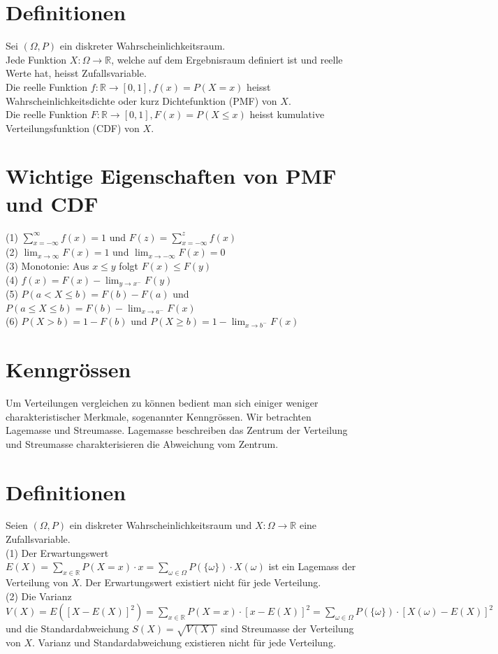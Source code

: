 \documentclass[10pt]{article}
\begin{document}
\section*{Definitionen}
Sei $(\Omega, P)$ ein diskreter Wahrscheinlichkeitsraum.\\
Jede Funktion $X: \Omega \rightarrow \mathbb{R}$, welche auf dem Ergebnisraum definiert ist und reelle Werte hat, heisst Zufallsvariable.\\
Die reelle Funktion $f: \mathbb{R} \rightarrow[0,1], f(x)=P(X=x)$ heisst Wahrscheinlichkeitsdichte oder kurz Dichtefunktion (PMF) von $X$.\\
Die reelle Funktion $F: \mathbb{R} \rightarrow[0,1], F(x)=P(X \leq x)$ heisst kumulative Verteilungsfunktion (CDF) von $X$.

\section*{Wichtige Eigenschaften von PMF und CDF}
(1) $\sum_{x=-\infty}^{\infty} f(x)=1$ und $F(z)=\sum_{x=-\infty}^{z} f(x)$\\
(2) $\lim _{x \rightarrow \infty} F(x)=1$ und $\lim _{x \rightarrow-\infty} F(x)=0$\\
(3) Monotonie: Aus $x \leq y$ folgt $F(x) \leq F(y)$\\
(4) $f(x)=F(x)-\lim _{y \rightarrow x^{-}} F(y)$\\
(5) $P(a<X \leq b)=F(b)-F(a)$ und $P(a \leq X \leq b)=F(b)-\lim _{x \rightarrow a^{-}} F(x)$\\
(6) $P(X>b)=1-F(b)$ und $P(X \geq b)=1-\lim _{x \rightarrow b^{-}} F(x)$

\section*{Kenngrössen}
Um Verteilungen vergleichen zu können bedient man sich einiger weniger charakteristischer Merkmale, sogenannter Kenngrössen. Wir betrachten Lagemasse und Streumasse. Lagemasse beschreiben das Zentrum der Verteilung und Streumasse charakterisieren die Abweichung vom Zentrum.

\section*{Definitionen}
Seien $(\Omega, P)$ ein diskreter Wahrscheinlichkeitsraum und $X: \Omega \rightarrow \mathbb{R}$ eine Zufallsvariable.\\
(1) Der Erwartungswert $E(X)=\sum_{x \in \mathbb{R}} P(X=x) \cdot x=\sum_{\omega \in \Omega} P(\{\omega\}) \cdot X(\omega)$ ist ein Lagemass der Verteilung von $X$. Der Erwartungswert existiert nicht für jede Verteilung.\\
(2) Die Varianz $V(X)=E\left([X-E(X)]^{2}\right)=\sum_{x \in \mathbb{R}} P(X=x) \cdot[x-E(X)]^{2}=\sum_{\omega \in \Omega} P(\{\omega\}) \cdot[X(\omega)-E(X)]^{2}$ und die Standardabweichung $S(X)=\sqrt{V(X)}$ sind Streumasse der Verteilung von $X$. Varianz und Standardabweichung existieren nicht für jede Verteilung.
\end{document}
